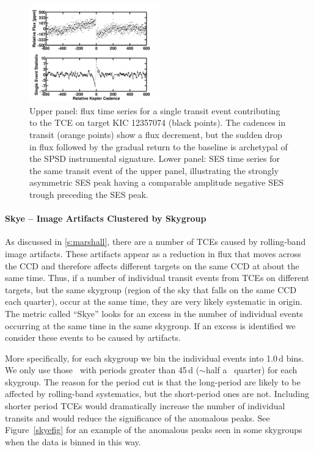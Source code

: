 \begin{figure}[h!]
\includegraphics[width=0.5\textwidth]{kic12357074_spsd.png}
\caption{Upper panel: flux time series for a single transit event contributing to the TCE on target KIC 12357074 (black points).  The cadences in transit (orange points) show a flux decrement, but the sudden drop in flux followed by the gradual return to the baseline is archetypal of the SPSD instrumental signature.  Lower panel: SES time series for the same transit event of the upper panel, illustrating the strongly asymmetric SES peak having a comparable amplitude negative SES trough preceding the SES peak.}
\label{fig:chases3}
\end{figure}


\paragraph{Skye -- Image Artifacts Clustered by Skygroup}
\label{s:skye}

As discussed in \ref{s:marshall}, there are a number of TCEs caused by rolling-band image artifacts. These artifacts appear as a reduction in flux that moves across the CCD and therefore affects different targets on the same CCD at about the same time. Thus, if a number of individual transit events from TCEs on different targets, but the same skygroup (region of the sky that falls on the same CCD each quarter), occur at the same time, they are very likely systematic in origin. The metric called ``Skye'' looks for an excess in the number of individual events occurring at the same time in the same skygroup. If an excess is identified we consider these events to be caused by artifacts. 

More specifically, for each skygroup we bin the individual events into 1.0\,d bins. We only use those \opstce\ with periods greater than 45\,d ($\sim$half a \Kepler\ quarter) for each skygroup. The reason for the period cut is that the long-period  are likely to be affected by rolling-band systematics, but the short-period ones are not.  Including shorter period TCEs would dramatically increase the number of individual transits and would reduce the significance of the anomalous peaks.  See Figure~\ref{skyefig} for an example of the anomalous peaks seen in some skygroups when the data is binned in this way.

